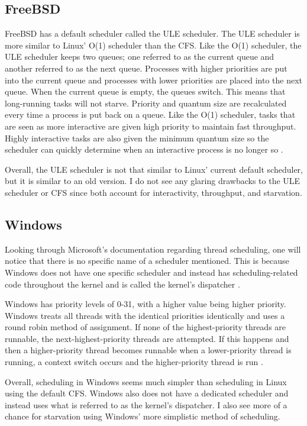 \documentclass[10pt,draftclsnofoot,onecolumn,journal,compsoc]{IEEEtran}
\begin{document}
\subsection{FreeBSD}
FreeBSD has a default scheduler called the ULE scheduler. The ULE scheduler is more similar to Linux' O(1) scheduler than the CFS. Like the O(1) scheduler, the ULE scheduler keeps two queues; one referred to as the current queue and another referred to as the next queue. Processes with higher priorities are put into the current queue and processes with lower priorities are placed into the next queue. When the current queue is empty, the queues switch. This means that long-running tasks will not starve. Priority and quantum size are recalculated every time a process is put back on a queue. Like the O(1) scheduler, tasks that are seen as more interactive are given high priority to maintain fast throughput. Highly interactive tasks are also given the minimum quantum size so the scheduler can quickly determine when an interactive process is no longer so \cite{bsd_shd}.

Overall, the ULE scheduler is not that similar to Linux' current default scheduler, but it is similar to an old version. I do not see any glaring drawbacks to the ULE scheduler or CFS since both account for interactivity, throughput, and starvation. 

\subsection{Windows}
Looking through Microsoft's documentation regarding thread scheduling, one will notice that there is no specific name of a scheduler mentioned. This is because Windows does not have one specific scheduler and instead has scheduling-related code throughout the kernel and is called the kernel's dispatcher \cite{win_shd}. 

Windows has priority levels of 0-31, with a higher value being higher priority. Windows treats all threads with the identical priorities identically and uses a round robin method of assignment. If none of the highest-priority threads are runnable, the next-highest-priority threads are attempted. If this happens and then a higher-priority thread becomes runnable when a lower-priority thread is running, a context switch occurs and the higher-priority thread is run \cite{win_shd2}. 

Overall, scheduling in Windows seems much simpler than scheduling in Linux using the default CFS. Windows also does not have a dedicated scheduler and instead uses what is referred to as the kernel's dispatcher. I also see more of a chance for starvation using Windows' more simplistic method of scheduling.
\end{document}
